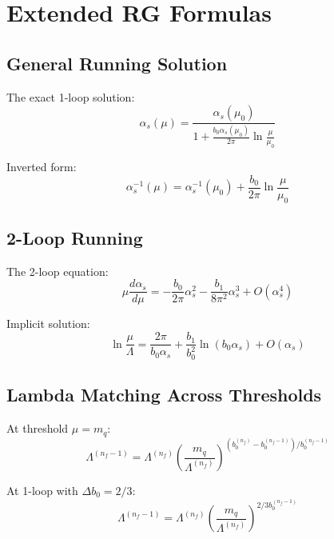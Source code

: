 \documentclass[11pt,a4paper]{article}
\theoremstyle{definition}
\begin{document}
\section{Extended RG Formulas}
\label{sec:extended-rg}

\subsection{General Running Solution}
\label{subsec:general-running}

The exact 1-loop solution:
\begin{equation}
\label{eq:exact-1loop-sol}
\alpha_s(\mu) = \frac{\alpha_s(\mu_0)}{1 + \frac{b_0\alpha_s(\mu_0)}{2\pi}\ln\frac{\mu}{\mu_0}}
\end{equation}

Inverted form:
\begin{equation}
\label{eq:exact-1loop-inv}
\alpha_s^{-1}(\mu) = \alpha_s^{-1}(\mu_0) + \frac{b_0}{2\pi}\ln\frac{\mu}{\mu_0}
\end{equation}

\subsection{2-Loop Running}
\label{subsec:2loop-running}

The 2-loop equation:
\begin{equation}
\label{eq:2loop-rge}
\mu\frac{d\alpha_s}{d\mu} = -\frac{b_0}{2\pi}\alpha_s^2 - \frac{b_1}{8\pi^2}\alpha_s^3 + O(\alpha_s^4)
\end{equation}

Implicit solution:
\begin{equation}
\label{eq:2loop-solution}
\ln\frac{\mu}{\Lambda} = \frac{2\pi}{b_0\alpha_s} + \frac{b_1}{b_0^2}\ln(b_0\alpha_s)
  + O(\alpha_s)
\end{equation}

\subsection{Lambda Matching Across Thresholds}
\label{subsec:lambda-matching}

At threshold $\mu = m_q$:
\begin{equation}
\label{eq:lambda-thresh-match}
\Lambda^{(n_f-1)} = \Lambda^{(n_f)} \left(\frac{m_q}{\Lambda^{(n_f)}}\right)^{(b_0^{(n_f)} - b_0^{(n_f-1)})/b_0^{(n_f-1)}}
\end{equation}

At 1-loop with $\Delta b_0 = 2/3$:
\begin{equation}
\label{eq:lambda-thresh-1loop}
\Lambda^{(n_f-1)} = \Lambda^{(n_f)} \left(\frac{m_q}{\Lambda^{(n_f)}}\right)^{2/3b_0^{(n_f-1)}}
\end{equation}
\end{document}
